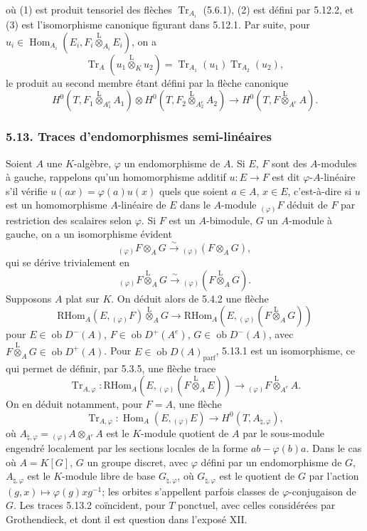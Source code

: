 \documentclass[11pt]{article}
\DeclareMathOperator{\Hom}{Hom}
\newcommand{\ob}{\operatorname{ob}}
\providecommand{\RHom}{\mathrm{RHom}}
\providecommand{\Tr}{\operatorname{Tr}}
\providecommand{\Tr}{\operatorname{Tr}}
\providecommand{\lten}{\overset{\mathrm L}{\otimes}}
\providecommand{\Tr}{\operatorname{Tr}}
\providecommand{\RHom}{\mathrm{RHom}}
\providecommand{\Hom}{\operatorname{Hom}}
\providecommand{\ob}{\operatorname{ob}}
\providecommand{\lten}{\overset{\mathrm L}{\otimes}}
\providecommand{\RHom}{\mathrm R\mathcal{H}om}
\providecommand{\lten}{\overset{\mathrm L}{\otimes}}
\providecommand{\Tr}{\operatorname{Tr}}
\providecommand{\lten}{\overset{\mathrm L}{\otimes}}
\providecommand{\lten}{\overset{\mathrm L}{\otimes}}
\providecommand{\lten}{\overset{\mathrm L}{\otimes}}
\providecommand{\RHom}{\mathrm{RHom}}
\providecommand{\Hom}{\operatorname{Hom}}
\providecommand{\Tr}{\operatorname{Tr}}
\providecommand{\lten}{\overset{\mathrm L}{\otimes}}
\begin{document}
où (1) est produit tensoriel des flèches $\Tr_{A_i}$ (5.6.1), (2) est défini par 5.12.2, et (3) est l'isomorphisme canonique figurant dans 5.12.1. Par suite, pour $u_i\in\Hom_{A_i}(E_i,F_i\lten_{A_i}E_i)$, on a
\begin{equation}\tag{5.12.5}
\Tr_A(u_1\lten_Ku_2)=\Tr_{A_1}(u_1)\Tr_{A_2}(u_2),
\end{equation}
le produit au second membre étant défini par la flèche canonique
\[
H^0(T,F_1\lten_{A_1^e}A_1)\otimes H^0(T,F_2\lten_{A_2^e}A_2)
\longrightarrow H^0(T,F\lten_{A^e}A).
\]

\subsubsection*{5.13. Traces d'endomorphismes semi-linéaires}

Soient $A$ une $K$-algèbre, $\varphi$ un endomorphisme de $A$. Si $E$, $F$ sont des $A$-modules à gauche, rappelons qu'un homomorphisme additif $u:E\to F$ est dit $\varphi$-$A$-linéaire s'il vérifie $u(ax)=\varphi(a)u(x)$ quels que soient $a\in A$, $x\in E$, c'est-à-dire si $u$ est un homomorphisme $A$-linéaire de $E$ dans le $A$-module ${}_{(\varphi)}F$ déduit de $F$ par restriction des scalaires selon $\varphi$. Si $F$ est un $A$-bimodule, $G$ un $A$-module à gauche, on a un isomorphisme évident
\[
{}_{(\varphi)}F\otimes_AG\xrightarrow{\sim}{}_{(\varphi)}(F\otimes_AG),
\]
qui se dérive trivialement en
\[
{}_{(\varphi)}F\lten_AG\xrightarrow{\sim}{}_{(\varphi)}(F\lten_AG).
\]
Supposons $A$ plat sur $K$. On déduit alors de 5.4.2 une flèche
\begin{equation}\tag{5.13.1}
\RHom_A(E,{}_{(\varphi)}F)\lten_AG\longrightarrow\RHom_A(E,{}_{(\varphi)}(F\lten_AG))
\end{equation}
pour $E\in\ob D^-(A)$, $F\in\ob D^+(A^e)$, $G\in\ob D^-(A)$, avec $F\lten_AG\in\ob D^+(A)$. Pour $E\in\ob D(A)_{\mathrm{parf}}$, 5.13.1 est un isomorphisme, ce qui permet de définir, par 5.3.5, une flèche trace
\begin{equation}\tag{5.13.2}
\Tr_{A,\varphi}:\RHom_A(E,{}_{(\varphi)}(F\lten_AE))\longrightarrow {}_{(\varphi)}F\lten_{A^e}A.
\end{equation}
On en déduit notamment, pour $F=A$, une flèche
\begin{equation}\tag{5.13.3}
\Tr_{A,\varphi}:\Hom_A(E,{}_{(\varphi)}E)\longrightarrow H^0(T,A_{\natural,\varphi}),
\end{equation}
où $A_{\natural,\varphi}={}_{(\varphi)}A\otimes_{A^e}A$ est le $K$-module quotient de $A$ par le sous-module engendré localement par les sections locales de la forme $ab-\varphi(b)a$. Dans le cas où $A=K[G]$, $G$ un groupe discret, avec $\varphi$ défini par un endomorphisme de $G$, $A_{\natural,\varphi}$ est le $K$-module libre de base $G_{\natural,\varphi}$, où $G_{\natural,\varphi}$ est le quotient de $G$ par l'action $(g,x)\mapsto\varphi(g)xg^{-1}$; les orbites s'appellent parfois classes de $\varphi$-conjugaison de $G$. Les traces 5.13.2 coïncident, pour $T$ ponctuel, avec celles considérées par Grothendieck, et dont il est question dans l'exposé XII.
\end{document}
